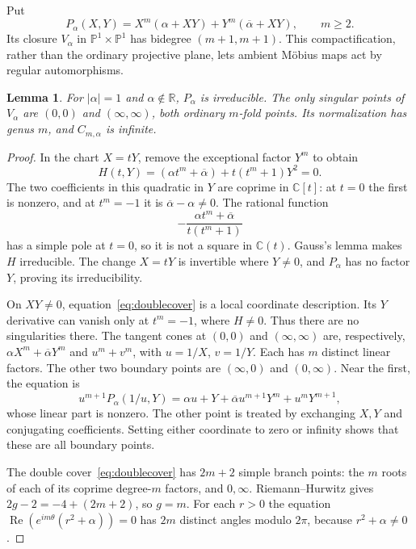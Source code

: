 \documentclass[11pt,a4paper]{article}
\newtheorem{lemma}[theorem]{Lemma}
\theoremstyle{definition}
\newcommand{\C}{\mathbb{C}}
\newcommand{\R}{\mathbb{R}}
\newcommand{\PP}{\mathbb{P}}
\DeclareMathOperator{\Rea}{Re}
\begin{document}
Put
\begin{equation}\label{eq:complexification}
 P_\alpha(X,Y)=X^m(\alpha+XY)+Y^m(\overline\alpha+XY),
 \qquad m\ge2.
\end{equation}
Its closure $V_\alpha$ in $\PP^1\times\PP^1$ has bidegree
$(m+1,m+1)$. This compactification, rather than the ordinary projective
plane, lets ambient M\"obius maps act by regular automorphisms.

\begin{lemma}\label{lem:geometry}
For $|\alpha|=1$ and $\alpha\notin\R$, $P_\alpha$ is irreducible.
The only singular points of $V_\alpha$ are $(0,0)$ and
$(\infty,\infty)$, both ordinary $m$-fold points. Its normalization
has genus $m$, and $C_{m,\alpha}$ is infinite.
\end{lemma}

\begin{proof}
In the chart $X=tY$, remove the exceptional factor $Y^m$ to obtain
\begin{equation}\label{eq:doublecover}
 H(t,Y)=(\alpha t^m+\overline\alpha)+t(t^m+1)Y^2=0.
\end{equation}
The two coefficients in this quadratic in $Y$ are coprime in
$\C[t]$: at $t=0$ the first is nonzero, and at $t^m=-1$ it is
$\overline\alpha-\alpha\ne0$.
The rational function
\[
 -\frac{\alpha t^m+\overline\alpha}{t(t^m+1)}
\]
has a simple pole at $t=0$, so it is not a square in $\C(t)$.
Gauss's lemma makes $H$ irreducible. The change $X=tY$ is invertible
where $Y\ne0$, and $P_\alpha$ has no factor $Y$, proving its
irreducibility.

On $XY\ne0$, equation~\eqref{eq:doublecover} is a local coordinate
description. Its $Y$ derivative can vanish only at $t^m=-1$,
where $H\ne0$. Thus there are no singularities there.
The tangent cones at $(0,0)$ and $(\infty,\infty)$ are, respectively,
$\alpha X^m+\overline\alpha Y^m$ and $u^m+v^m$, with
$u=1/X$, $v=1/Y$. Each has $m$ distinct linear factors.
The other two boundary points are $(\infty,0)$ and $(0,\infty)$.
Near the first, the equation is
\[
 u^{m+1}P_\alpha(1/u,Y)
 =\alpha u+Y+\overline\alpha u^{m+1}Y^m+u^{m}Y^{m+1},
\]
whose linear part is nonzero. The other point is treated by exchanging
$X,Y$ and conjugating coefficients. Setting either coordinate to zero
or infinity shows that these are all boundary points.

The double cover~\eqref{eq:doublecover} has $2m+2$ simple branch
points: the $m$ roots of each of its coprime degree-$m$ factors, and
$0,\infty$. Riemann--Hurwitz gives $2g-2=-4+(2m+2)$, so $g=m$. %
For each $r>0$ the equation
$\Rea(e^{im\theta}(r^2+\alpha))=0$ has $2m$ distinct angles
modulo $2\pi$, because $r^2+\alpha\ne0$.
\end{proof}
\end{document}
